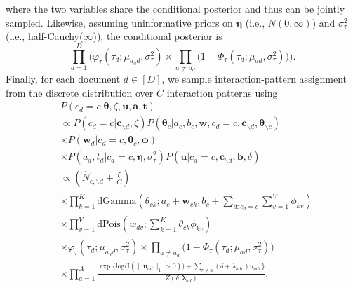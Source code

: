 \documentclass[11pt]{article}
\begin{document}
where the two variables share the conditional posterior and thus can be jointly sampled. Likewise, assuming uninformative priors on $\boldsymbol{\eta}$ (i.e., $N({0},\infty)$) and $\sigma_{\tau}^2$ (i.e., half-Cauchy($\infty$)), the conditional posterior is
\begin{equation}
\prod_{d=1}^D\Big(\varphi_{\tau}(\tau_{d}; \mu_{a_d d}, \sigma_\tau^2)\times \prod_{a\neq a_d}\big(1-\Phi_{\tau}(\tau_{d}; \mu_{a d}, \sigma_\tau^2) \big)\Big).
\end{equation}
Finally, for each document $d \in [D]$, we sample interaction-pattern assignment from the discrete distribution over $C$ interaction patterns using 
\begin{equation}
\begin{aligned}
&P(c_d = c|\boldsymbol{\theta}, \zeta, \boldsymbol{u},\boldsymbol{a}, \boldsymbol{t})
\\&\propto P(c_d=c|\boldsymbol{c}_{\backslash d}, \zeta) P(\boldsymbol{\theta}_c|a_c, b_c, \boldsymbol{w}, c_d=c, \boldsymbol{c}_{\backslash d}, \boldsymbol{\theta}_{\backslash c})\\&\times P( \boldsymbol{w}_d|c_d = c, \boldsymbol{\theta}_c, \boldsymbol{\phi})\\
&\times P(a_d, t_d|c_d = c, \boldsymbol{\eta}, \sigma_\tau^2) P(\boldsymbol{u}|c_d=c, \boldsymbol{c}_{\backslash d}, \boldsymbol{b}, \delta) 
\\&\propto (\hat N_{c, \backslash d}+\frac{\zeta}{C}) \\&
\times \prod_{k=1}^K\mbox{dGamma}(\theta_{ck}; a_c + \boldsymbol{w}_{ck}, b_c +\sum\limits_{d:c_d=c} \sum_{v=1}^V\phi_{kv})\\&\times \prod_{v=1}^V \mbox{dPois}(w_{dv}; \sum_{k=1}^K \theta_{ck}\phi_{kv})\\&\times
\varphi_{\tau}(\tau_{d}; \mu_{a_d d}, \sigma_\tau^2)\times \prod_{a\neq a_d}\big(1-\Phi_{\tau}(\tau_{d}; \mu_{a d}, \sigma_\tau^2) \big)\\& 
\times
\prod_{a=1}^A \frac{\exp\Big\{\mbox{log}\big(\text{I}( \lVert \boldsymbol{u}_{ad}\rVert_1 > 0)\big) + \sum\limits_{r \neq a} (\delta+\lambda_{adr})u_{adr}\Big\}}{Z(\delta,\boldsymbol{\lambda}_{ad})}.\\
\end{aligned}
\end{equation}
\end{document}
